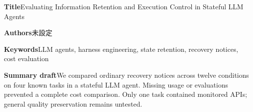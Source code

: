 \documentclass[uplatex,a4paper,twocolumn,10pt]{jsarticle}
\begin{document}
\clearpage
\onecolumn
\noindent\textbf{Title}\quad Evaluating Information Retention and Execution Control in Stateful LLM Agents

\noindent\textbf{Authors}\quad 未設定

\noindent\textbf{Keywords}\quad LLM agents, harness engineering, state retention, recovery notices, cost evaluation

\noindent\textbf{Summary draft}\quad We compared ordinary recovery notices across twelve conditions on four known tasks in a stateful LLM agent. Missing usage or evaluations prevented a complete cost comparison. Only one task contained monitored APIs; general quality preservation remains untested.
\end{document}
